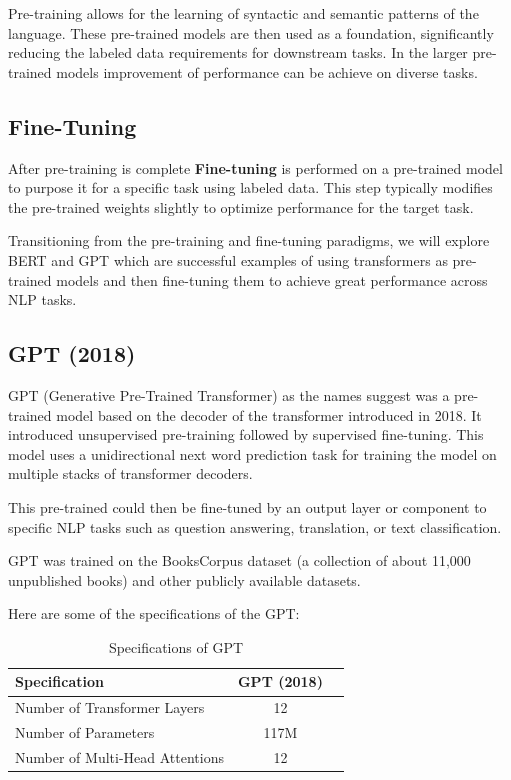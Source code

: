 Pre-training allows for the learning of syntactic and semantic patterns of the language. These pre-trained models are then used as a foundation, significantly reducing the labeled data requirements for downstream tasks. In the larger pre-trained models improvement of performance can be achieve on diverse tasks.

\subsection{Fine-Tuning}
After pre-training is complete \textbf{Fine-tuning} is performed on a pre-trained model to purpose it for a specific task using labeled data. This step typically modifies the pre-trained weights slightly to optimize performance for the target task.

Transitioning from the pre-training and fine-tuning paradigms, we will explore BERT and GPT which are successful examples of using transformers as pre-trained models and then fine-tuning them to achieve great performance across NLP tasks.

\subsection{GPT (2018)}
GPT (Generative Pre-Trained Transformer) as the names suggest was a pre-trained model based on the decoder of the transformer introduced in 2018.  It introduced unsupervised pre-training followed by supervised fine-tuning. This model uses a unidirectional next word prediction task for training the model on multiple stacks of transformer decoders.

This pre-trained could then be fine-tuned by an output layer or component to specific NLP tasks such as question answering, translation, or text classification.

GPT was trained on the BooksCorpus dataset (a collection of about 11,000 unpublished books) and other publicly available datasets.

Here are some of the specifications of the GPT:

\begin{table}[H]
\centering
\renewcommand{\arraystretch}{1.5}
\setlength{\tabcolsep}{10pt}
\begin{tabular}{@{}lcc@{}}
\toprule
\textbf{Specification}          & \textbf{GPT (2018)}      \\ \midrule
Number of Transformer Layers    & 12                           \\
Number of Parameters            & 117M                         \\
Number of Multi-Head Attentions & 12                           \\ \bottomrule
\end{tabular}
\caption{Specifications of GPT }
\label{tab:gpt_specs}
\end{table}

